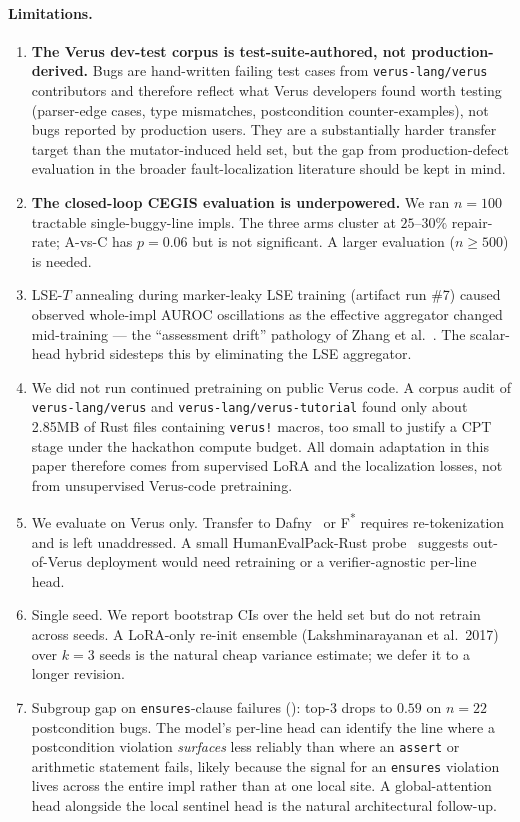 \documentclass[10pt]{article}
\begin{document}
\paragraph{Limitations.}
\begin{enumerate}[leftmargin=*,itemsep=2pt,topsep=2pt]
\item \textbf{The Verus dev-test corpus is test-suite-authored, not
  production-derived.} Bugs are hand-written failing test cases from
  \texttt{verus-lang/verus} contributors and therefore reflect what
  Verus developers found worth testing (parser-edge cases, type
  mismatches, postcondition counter-examples), not bugs reported by
  production users. They are a substantially harder transfer target
  than the mutator-induced held set, but the gap from production-defect
  evaluation in the broader fault-localization literature should be
  kept in mind.
\item \textbf{The closed-loop CEGIS evaluation is underpowered.} We
  ran $n=100$ tractable single-buggy-line impls. The three arms
  cluster at $25$--$30\%$ repair-rate; A-vs-C has $p=0.06$ but is not
  significant. A larger evaluation ($n \ge 500$) is needed.
\item LSE-$T$ annealing during marker-leaky LSE training
  (artifact run \#7) caused observed whole-impl AUROC oscillations
  as the effective aggregator changed mid-training --- the
  ``assessment drift'' pathology of Zhang et
  al.~\cite{zhang2025lessonsprm}. The scalar-head hybrid sidesteps
  this by eliminating the LSE aggregator.
\item We did not run continued pretraining on public Verus code. A
  corpus audit of \texttt{verus-lang/verus} and
  \texttt{verus-lang/verus-tutorial} found only about 2.85MB of Rust
  files containing \texttt{verus!} macros, too small to justify a CPT
  stage under the hackathon compute budget. All domain adaptation in
  this paper therefore comes from supervised LoRA and the localization
  losses, not from unsupervised Verus-code pretraining.
\item We evaluate on Verus only. Transfer to Dafny~\cite{dafny} or
  F\textsuperscript{*} requires re-tokenization and is left
  unaddressed. A small HumanEvalPack-Rust probe~\cite{muennighoff2024octopack}
  suggests out-of-Verus deployment would need retraining or a
  verifier-agnostic per-line head.
\item Single seed. We report bootstrap CIs over the held set but do
  not retrain across seeds. A LoRA-only re-init ensemble
  (Lakshminarayanan et al.~2017) over $k=3$ seeds is the natural
  cheap variance estimate; we defer it to a longer revision.
\item Subgroup gap on \texttt{ensures}-clause failures
  (): top-3 drops to $0.59$ on $n=22$ postcondition
  bugs. The model's per-line head can identify the line where a
  postcondition violation \emph{surfaces} less reliably than where an
  \texttt{assert} or arithmetic statement fails, likely because the
  signal for an \texttt{ensures} violation lives across the entire
  impl rather than at one local site. A global-attention head
  alongside the local sentinel head is the natural architectural
  follow-up.
\end{enumerate}
\end{document}
